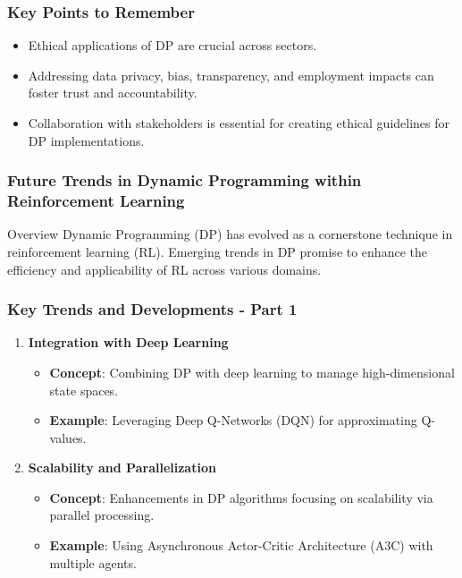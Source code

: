 \documentclass[aspectratio=169]{beamer}
\begin{document}
\begin{frame}[fragile]
  \frametitle{Key Points to Remember}
  
  \begin{itemize}
    \item Ethical applications of DP are crucial across sectors.
    \item Addressing data privacy, bias, transparency, and employment impacts can foster trust and accountability.
    \item Collaboration with stakeholders is essential for creating ethical guidelines for DP implementations.
  \end{itemize}
\end{frame}

\begin{frame}[fragile]
    \frametitle{Future Trends in Dynamic Programming within Reinforcement Learning}
    \begin{block}{Overview}
        Dynamic Programming (DP) has evolved as a cornerstone technique in reinforcement learning (RL). Emerging trends in DP promise to enhance the efficiency and applicability of RL across various domains.
    \end{block}
\end{frame}

\begin{frame}[fragile]
    \frametitle{Key Trends and Developments - Part 1}
    \begin{enumerate}
        \item \textbf{Integration with Deep Learning}
            \begin{itemize}
                \item \textbf{Concept}: Combining DP with deep learning to manage high-dimensional state spaces.
                \item \textbf{Example}: Leveraging Deep Q-Networks (DQN) for approximating Q-values.
            \end{itemize}
        
        \item \textbf{Scalability and Parallelization}
            \begin{itemize}
                \item \textbf{Concept}: Enhancements in DP algorithms focusing on scalability via parallel processing.
                \item \textbf{Example}: Using Asynchronous Actor-Critic Architecture (A3C) with multiple agents.
            \end{itemize}
    \end{enumerate}
\end{frame}
\end{document}
